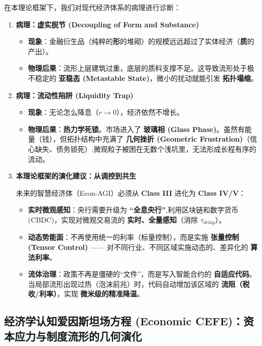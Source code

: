 在本理论框架下，我们对现代经济体系的病理进行诊断：
\begin{enumerate}
    \item \textbf{病理：虚实脱节 (Decoupling of Form and Substance)}
    \begin{itemize}
        \item   \textbf{现象}：金融衍生品（纯粹的\textbf{形}的堆砌）的规模远远超过了实体经济（\textbf{质}的产出）。
        \item   \textbf{物理后果}：流形上层建筑过重，底层的质料支撑不足。这导致流形处于极不稳定的 \textbf{亚稳态 (Metastable State)}，微小的扰动就能引发 \textbf{拓扑塌缩}。
    \end{itemize}

    \item \textbf{病理：流动性陷阱 (Liquidity Trap)}
    \begin{itemize}
        \item   \textbf{现象}：无论怎么降息（$r \to 0$），经济依然不增长。
        \item   \textbf{物理后果}：\textbf{热力学死锁}。市场进入了 \textbf{玻璃相 (Glass Phase)}。虽然有能量（钱），但拓扑结构中充满了 \textbf{几何挫折 (Geometric Frustration)}（信心缺失、债务锁死）,微观粒子被困在无数个浅坑里，无法形成长程有序的流动。
    \end{itemize}

    \item \textbf{本理论框架的演化建议：从调控到共生}

    未来的智慧经济体（Econ-AGI）必须从 \textbf{Class III} 进化为 \textbf{Class IV/V}：
    \begin{itemize}
        \item   \textbf{实时微观感知}：央行需要升级为 \textbf{“全息央行”},利用区块链和数字货币 (CBDC)，实现对微观交易流的 \textbf{实时、全量感知}（消除 $\tau_{delay}$）。
        \item   \textbf{动态势能面}：不再使用统一的利率（标量控制），而是实施 \textbf{张量控制 (Tensor Control)} —— 对不同行业、不同区域实施动态的、差异化的 \textbf{算法利率}。
        \item   \textbf{流体治理}：政策不再是僵硬的“文件”，而是写入智能合约的 \textbf{自适应代码}。当局部流形出现过热（泡沫前兆）时，代码自动增加该区域的 \textbf{流阻（税收/利率）}，实现 \textbf{微米级的精准降温}。
    \end{itemize}
\end{enumerate}

\subsection{经济学认知爱因斯坦场方程 (Economic CEFE)：资本应力与制度流形的几何演化}
\label{subsec:economic_cefe}

